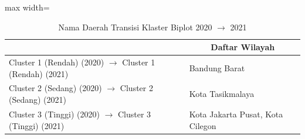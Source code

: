 \begin{table}[H]
\centering
\caption{Nama Daerah Transisi Klaster Biplot 2020 \(\rightarrow\) 2021} \label{tab:sample1biplot_trans_name_2020x2021}
\begin{adjustbox}{max width=\textwidth}
\begin{tabular}{|>{\centering\arraybackslash}p{4cm}|p{10cm}|}
\hline
\multicolumn{1}{|c|}{\textbf{Kategori}} & \multicolumn{1}{c|}{\textbf{Daftar Wilayah}} \\
\hline
Cluster 1 (Rendah) (2020) \(\rightarrow\) Cluster 1 (Rendah) (2021) & Bandung Barat \\
\hline
Cluster 2 (Sedang) (2020) \(\rightarrow\) Cluster 2 (Sedang) (2021) & Kota Tasikmalaya \\
\hline
Cluster 3 (Tinggi) (2020) \(\rightarrow\) Cluster 3 (Tinggi) (2021) & Kota Jakarta Pusat, Kota Cilegon \\
\hline
\end{tabular}
\end{adjustbox}
\end{table}